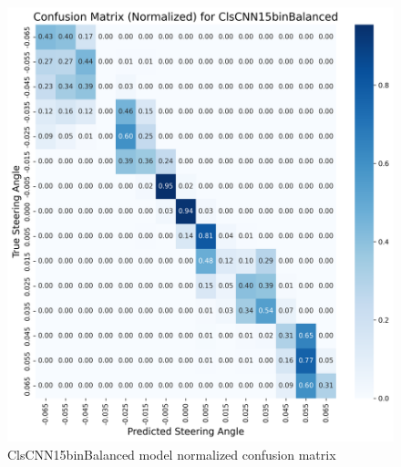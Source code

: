 \begin{figure}[H]
\centering
\includegraphics[width=1\linewidth]{Figures/Results/cm_norm_ClsCNN15binBalanced.png}
\caption{ClsCNN15binBalanced model normalized confusion matrix}
\label{fig:cm_norm_ClsCNN15binBalanced}
\end{figure}


